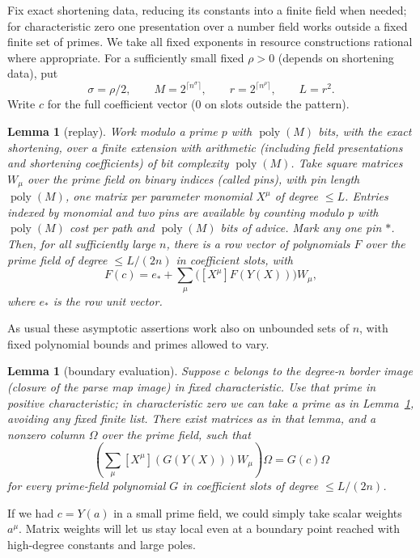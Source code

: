 \documentclass[11pt,letterpaper]{article}
\newtheorem{lemma}[theorem]{Lemma}
\theoremstyle{definition}
\numberwithin{equation}{section}
\DeclareMathOperator{\poly}{poly}
\begin{document}
Fix exact shortening data, reducing its constants into a finite field when needed; for
characteristic zero one presentation over a number field works outside a fixed finite set of
primes. We take all fixed exponents in resource constructions rational where appropriate.
For a sufficiently small fixed $\rho >0$ (depends on shortening data), put
\[
  \sigma=\rho/2,\qquad M=2^{\lceil n^\sigma\rceil},\qquad r=2^{\lceil n^\rho\rceil},\qquad L=r^2.
\]
Write $c$ for the full coefficient vector ($0$ on slots outside the pattern).

\begin{lemma}[replay]\label{thm:replay}
Work modulo a prime $p$ with $\poly(M)$ bits, with the exact shortening,
over a finite extension with arithmetic (including field presentations and shortening coefficients)
of bit complexity $\poly(M)$. Take square matrices $W_\mu$ over the prime field on binary
indices (called pins), with pin length $\poly(M)$, one matrix per parameter monomial $X^\mu$ of
degree $\le L$. Entries indexed by monomial and two pins are available by counting modulo
$p$ with $\poly(M)$ cost per path and $\poly(M)$ bits of advice. Mark any one pin $\ast$. Then, for
all sufficiently large $n$, there is a row vector of polynomials $F$ over the prime field of degree
$\le L/(2n)$ in coefficient slots, with
\[
  F(c) = e_\ast+ \sum_\mu \bigl([X^\mu] F(Y(X))\bigr) W_\mu,
\]
where $e_\ast$ is the row unit vector.
\end{lemma}

As usual these asymptotic assertions work also on unbounded sets of $n$, with fixed
polynomial bounds and primes allowed to vary.

\begin{lemma}[boundary evaluation]\label{thm:boundary}
Suppose $c$ belongs to the degree-$n$ border image (closure
of the parse map image) in fixed characteristic. Use that prime in positive characteristic; in
characteristic zero we can take a prime as in Lemma~\ref{thm:replay}, avoiding any fixed finite list. There
exist matrices as in that lemma, and a nonzero column $\Omega$ over the prime field, such that
\[
  \left(\sum_\mu[X^\mu](G(Y(X))) W_\mu\right)\Omega=G(c)\Omega
\]
for every prime-field polynomial $G$ in coefficient slots of degree $\le L/(2n)$.
\end{lemma}

If we had $c=Y(a)$ in a small prime field, we could simply take scalar weights $a^\mu$. Matrix
weights will let us stay local even at a boundary point reached with high-degree constants
and large poles.
\end{document}
